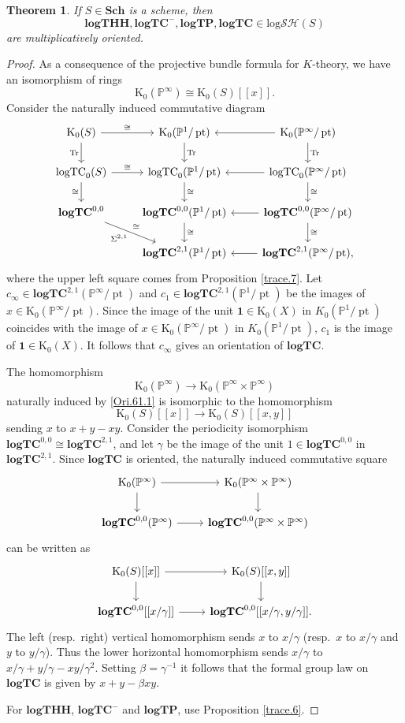 \documentclass[11pt, a4paper]{amsart}
\newtheorem{thm}{Theorem}[subsection]
\theoremstyle{definition}
\numberwithin{equation}{subsection}
\renewcommand{\P}{\mathbb{P}}
\newcommand{\Sch}{\mathbf{Sch}}
\newcommand{\pt}[1]{\mathrm{\pt}_{#1}}
\newcommand{\Tr}{\mathrm{Tr}}
\newcommand{\Kth}{\mathrm{K}}
\newcommand{\spectlogTHH}{\mathbf{logTHH}}
\newcommand{\logTC}{\mathrm{logTC}}
\newcommand{\spectlogTC}{\mathbf{logTC}}
\newcommand{\spectlogTP}{\mathbf{logTP}}
\def\pt{\operatorname{pt}}
\newcommand{\unit}{\mathbf{1}}
\newcommand{\inflogSH}{\mathrm{log}\mathcal{SH}}
\begin{document}
\begin{thm}
\label{trace.8}
If $S\in \Sch$ is a scheme, 
then
\[
\spectlogTHH,\spectlogTC^{-},\spectlogTP,\spectlogTC\in \inflogSH(S)
\]
are multiplicatively oriented.
\end{thm}
\begin{proof}
As a consequence of the projective bundle formula for $K$-theory, we have an isomorphism of rings
\[
\Kth_0(\P^\infty) \cong \Kth_0(S)[[x]].
\]
Consider the naturally induced commutative diagram
\[
\begin{tikzcd}
\Kth_0(S)\ar[r,"\cong"]\ar[d,"\Tr"']&
\Kth_0(\P^1/\pt)\ar[d,"\Tr"]\ar[r,leftarrow]&
\Kth_0(\P^\infty/\pt)\ar[d,"\Tr"]
\\
\logTC_0(S)\ar[d,"\cong"']\ar[r,"\cong"]&
\logTC_0(\P^1/\pt)\ar[d,"\cong"]\ar[r,leftarrow]&
\logTC_0(\P^\infty/\pt)\ar[d,"\cong"]
\\
\spectlogTC^{0,0}\ar[rd,"\cong","\Sigma^{2,1}"']&
\spectlogTC^{0,0}(\P^1/\pt)\ar[d,"\cong"]\ar[r,leftarrow]&
\spectlogTC^{0,0}(\P^\infty/\pt)\ar[d,"\cong"]
\\
&
\spectlogTC^{2,1}(\P^1/\pt)\ar[r,leftarrow]&
\spectlogTC^{2,1}(\P^\infty/\pt),
\end{tikzcd}
\]
where the upper left square comes from Proposition \ref{trace.7}.
Let $c_\infty\in \spectlogTC^{2,1}(\P^\infty/\pt)$ and $c_1\in \spectlogTC^{2,1}(\P^1/\pt)$ be the images of $x\in \Kth_0(\P^\infty/\pt)$.
Since the image of the unit $\unit\in \Kth_0(X)$ in $K_0(\P^1/\pt)$ coincides with the image of $x\in \Kth_0(\P^\infty/\pt)$ in $K_0(\P^1/\pt)$, $c_1$ is the image of $\unit\in \Kth_0(X)$.
It follows that $c_\infty$ gives an orientation of $\spectlogTC$.

The homomorphism
\[
\Kth_0(\P^\infty) \to \Kth_0(\P^\infty \times \P^\infty)
\]
naturally induced by \eqref{Ori.61.1} is isomorphic to the homomorphism
\[
\Kth_0(S)[[x]]\to \Kth_0(S)[[x,y]]
\]
sending $x$ to $x+y-xy$.
Consider the periodicity isomorphism $\spectlogTC^{0,0}\cong \spectlogTC^{2,1}$, 
and let $\gamma$ be the image of the unit $1\in \spectlogTC^{0,0}$ in $\spectlogTC^{2,1}$.
Since $\spectlogTC$ is oriented, 
the naturally induced commutative square
\[
\begin{tikzcd}
\Kth_0(\P^\infty)\ar[r]\ar[d]&
\Kth_0(\P^\infty\times \P^\infty)\ar[d]
\\
\spectlogTC^{0,0}(\P^\infty)\ar[r]&
\spectlogTC^{0,0}(\P^\infty\times \P^\infty)
\end{tikzcd}
\]
can be written as
\[
\begin{tikzcd}
\Kth_0(S)[[x]]\ar[r]\ar[d]&
\Kth_0(S)[[x,y]]\ar[d]
\\
\spectlogTC^{0,0}[[x/\gamma]]\ar[r]&
\spectlogTC^{0,0}[[x/\gamma,y/\gamma]].
\end{tikzcd}
\]
The left (resp.\ right) vertical homomorphism sends $x$ to $x/\gamma$ (resp.\ $x$ to $x/\gamma$ and $y$ to $y/\gamma$).
Thus the lower horizontal homomorphism sends $x/\gamma$ to $x/\gamma+y/\gamma-xy/\gamma^2$.
Setting $\beta=\gamma^{-1}$ it follows that the formal group law on $\spectlogTC$ is given by $x+y-\beta xy$.

For $\spectlogTHH$, $\spectlogTC^{-}$ and $\spectlogTP$, use Proposition \ref{trace.6}.
\end{proof}
\end{document}
